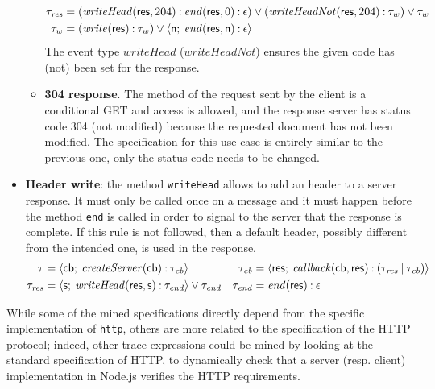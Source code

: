 \begin{itemize}
\begin{itemize}
\begin{align*}
			\tau_{\mathit{res}} &= (\mathit{writeHead}(\mathsf{res}, 204) \mathbin{:} \mathit{end}(\mathsf{res}, 0) \mathbin{:} \epsilon) \mathbin{\vee} (\mathit{writeHeadNot}(\mathsf{res}, 204) \mathbin{:} \tau_w) \mathbin{\vee} \tau_w\\
			\tau_w &= (\mathit{write}(\mathsf{res}) \mathbin{:} \tau_w) \mathbin{\vee} {\langle}\mathsf{n};\:{\mathit{end}(\mathsf{res}, \mathsf{n}) \mathbin{:} \epsilon}{\rangle}
		\end{align*}
		The event type \(\mathit{writeHead}\) (\(\mathit{writeHeadNot}\)) ensures the given code has (not) been set for the response.
	  \item \textbf{304 response}.
		The method of the request sent by the client is a conditional GET and access is allowed, and the response server has status code 304 (not modified) because the requested document has not been modified.
		The specification for this use case is entirely similar to the previous one, only the status code needs to be changed.
	\end{itemize}
	\item \textbf{Header write}: the method \lstinline{writeHead} allows to add an header to a server response.
	It must only be called once on a message and it must happen before the method \lstinline{end} is called in order to signal to the server that the response is complete.
	If this rule is not followed, then a default header, possibly different from the intended one, is used in the response.
	\begin{align*}
		\tau &= {\langle}\mathsf{\mathsf{cb}};\:{\mathit{createServer}(\mathsf{cb}) \mathbin{:} \tau_{\mathit{cb}}}{\rangle} &
		\tau_{\mathit{cb}} &= {\langle}\mathsf{ \mathsf{res} };\:{ \mathit{callback}(\mathsf{cb}, \mathsf{res}) \mathbin{:} (\tau_{\mathit{res}} \mathbin{|} \tau_{\mathit{cb}}) }{\rangle}\\
		\tau_{\mathit{res}} &= {\langle}\mathsf{s};\:{\mathit{writeHead}(\mathsf{res}, \mathsf{s}) \mathbin{:} \tau_{\mathit{end}}}{\rangle} \mathbin{\vee} \tau_{\mathit{end}} &
		\tau_{\mathit{end}} &= \mathit{end}(\mathsf{res}) \mathbin{:} \epsilon
	\end{align*}
\end{itemize}
While some of the mined specifications directly depend from the specific implementation of \lstinline{http}, others
are more related to the specification of the HTTP protocol; indeed, other trace expressions could be mined by looking at the
standard specification of HTTP, to dynamically check that a server (resp. client) implementation in Node.js verifies the HTTP
requirements.

